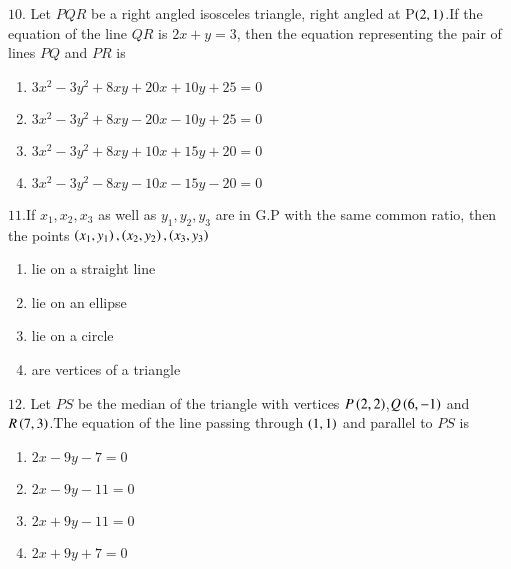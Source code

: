 \documentclass[journal,12pt,twocolumn]{IEEEtran}
\theoremstyle{remark}
\begin{document}
$10$. Let $PQR$ be a right angled isosceles triangle, right angled at P$\left(2,1\right)$.If the equation of the line $QR$ is $2x+y=3$, then the equation representing the pair of lines $PQ$ and $PR$ is \hfill{
\begin{enumerate}[label=\alph*]
    \item $3x^{2}-3y^{2}+8xy+20x+10y+25=0$
    \item $3x^{2}-3y^{2}+8xy-20x-10y+25=0$
    \item $3x^{2}-3y^{2}+8xy+10x+15y+20=0$
    \item $3x^{2}-3y^{2}-8xy-10x-15y-20=0$
\end{enumerate}
$11.$If $x_1,x_2,x_3$ as well as $y_1,y_2,y_3$ are in G.P with the same common ratio, then the points $\left(x_1,y_1\right),\left(x_2,y_2\right),\left(x_3,y_3\right)$\hfill{}
\begin{enumerate}[label=\alph*]
    \item lie on a straight line
    \item lie on an ellipse
    \item lie on a circle 
    \item are vertices of a triangle
\end{enumerate}
$12.$ Let $PS$ be the median of the triangle with vertices $P\left(2,2\right)$,$Q\left(6,-1\right)$ and $R\left(7,3\right)$.The equation of the line passing through $\left(1,1\right)$ and parallel to $PS$ is \hfill{}
\begin{enumerate}[label=\alph*]
    \item $2x-9y-7=0$
    \item $2x-9y-11=0$
    \item $2x+9y-11=0$
    \item $2x+9y+7=0$


\end{enumerate}}
\end{document}
